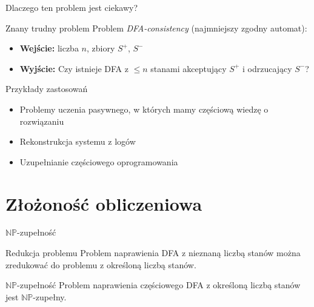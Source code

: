 \documentclass[10pt, aspectratio=169]{beamer}
\begin{document}
\begin{frame}{Dlaczego ten problem jest ciekawy?}
  \begin{block}{Znany trudny problem}
    Problem \textit{DFA-consistency} (najmniejszy zgodny automat):
    \begin{itemize}
      \item \textbf{Wejście:} liczba $n$, zbiory $S^+$, $S^-$
      \item \textbf{Wyjście:} Czy istnieje DFA z $\leq n$ stanami akceptujący $S^+$ i odrzucający $S^-$?
    \end{itemize}
  \end{block}
  
  \vspace{0.3cm}
  
  \begin{block}{Przykłady zastosowań}
    \begin{itemize}
      \item Problemy uczenia pasywnego, w których mamy częściową wiedzę o rozwiązaniu
      \item Rekonstrukcja systemu z logów
      \item Uzupełnianie częściowego oprogramowania
    \end{itemize}
  \end{block}
\end{frame}

\section{Złożoność obliczeniowa}
\begin{frame}{$\mathbb{NP}$-zupełność}
  \begin{block}{Redukcja problemu}
    Problem naprawienia DFA z nieznaną liczbą stanów można zredukować do problemu z określoną liczbą stanów.
  \end{block}

  \begin{block}{$\mathbb{NP}$-zupełność}
    Problem naprawienia częściowego DFA z określoną liczbą stanów jest $\mathbb{NP}$-zupełny.

  \end{block}
\end{frame}
\end{document}
